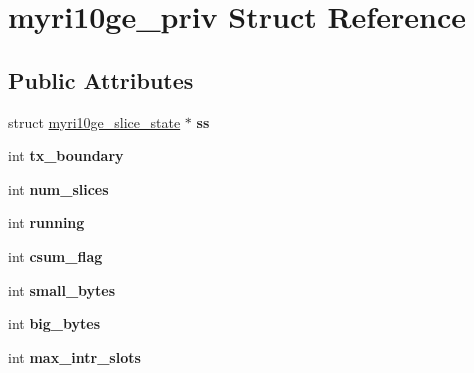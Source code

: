 \hypertarget{structmyri10ge__priv}{
\section{myri10ge\_\-priv Struct Reference}
\label{structmyri10ge__priv}
}
\subsection*{Public Attributes}
\begin{DoxyCompactItemize}
\item 
\hypertarget{structmyri10ge__priv_a829e4218379976291c7cd7d1e86af173}{
struct \hyperlink{structmyri10ge__slice__state}{myri10ge\_\-slice\_\-state} $\ast$ {\bfseries ss}}
\label{structmyri10ge__priv_a829e4218379976291c7cd7d1e86af173}

\item 
\hypertarget{structmyri10ge__priv_a54b3d6541a7f22f53a121b98fb7efa17}{
int {\bfseries tx\_\-boundary}}
\label{structmyri10ge__priv_a54b3d6541a7f22f53a121b98fb7efa17}

\item 
\hypertarget{structmyri10ge__priv_a4f6887c788d45d8869956e3e23475b1d}{
int {\bfseries num\_\-slices}}
\label{structmyri10ge__priv_a4f6887c788d45d8869956e3e23475b1d}

\item 
\hypertarget{structmyri10ge__priv_a1973fdc6847388c4b524e3a22bf6f952}{
int {\bfseries running}}
\label{structmyri10ge__priv_a1973fdc6847388c4b524e3a22bf6f952}

\item 
\hypertarget{structmyri10ge__priv_ac6919ef6f81da78746d95de47dc99166}{
int {\bfseries csum\_\-flag}}
\label{structmyri10ge__priv_ac6919ef6f81da78746d95de47dc99166}

\item 
\hypertarget{structmyri10ge__priv_aa7e8758ac62c5d16f7e8f3258f694308}{
int {\bfseries small\_\-bytes}}
\label{structmyri10ge__priv_aa7e8758ac62c5d16f7e8f3258f694308}

\item 
\hypertarget{structmyri10ge__priv_a6a679df543857f099f2b790feee76bd1}{
int {\bfseries big\_\-bytes}}
\label{structmyri10ge__priv_a6a679df543857f099f2b790feee76bd1}

\item 
\hypertarget{structmyri10ge__priv_a7d0b4743f9d35fd2b04fbc29a741a6f4}{
int {\bfseries max\_\-intr\_\-slots}}
\label{structmyri10ge__priv_a7d0b4743f9d35fd2b04fbc29a741a6f4}


\end{DoxyCompactItemize}
